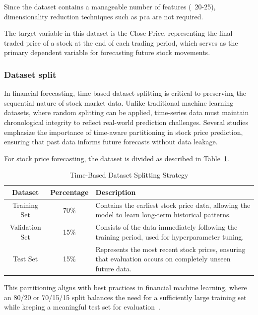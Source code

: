 Since the dataset contains a manageable number of features (~20-25),
dimensionality reduction techniques such as \acrfull{pca}
are not required. 

The target variable in this dataset is the Close Price, representing the final
traded price of a stock at the end of each trading period, which serves as the
primary dependent variable for forecasting future stock movements.

\subsubsection{Dataset split}

In financial forecasting, time-based dataset splitting is critical to
preserving the sequential nature of stock market data. Unlike traditional
machine learning datasets, where random splitting can be applied, time-series
data must maintain chronological integrity to reflect real-world prediction
challenges. Several studies emphasize the importance of time-aware partitioning
in stock price prediction, ensuring that past data informs future forecasts
without data leakage.

For stock price forecasting, the dataset is divided as described 
in Table~\ref{tab:dataset_split}.

\begin{table}[H]
    \centering
    \caption{Time-Based Dataset Splitting Strategy}
    \label{tab:dataset_split}
    \begin{tabular}{ccp{9cm}}
        \hline
        \textbf{Dataset} & \textbf{Percentage} & \textbf{Description} \\
        \hline\hline
        Training Set & 70\% & Contains the earliest stock
        price data, allowing the model to learn long-term historical patterns. \\
        Validation Set & 15\% & Consists of the data immediately following 
        the training period, used for hyperparameter tuning. \\
        Test Set & 15\% & Represents the most recent stock prices, ensuring that 
        evaluation occurs on completely unseen future data. \\
        \hline
    \end{tabular}
\end{table}

This partitioning aligns with best practices in financial machine learning, 
where an 80/20 or 70/15/15 split balances the need for a sufficiently large 
training set while keeping a meaningful test set for 
evaluation~\parencite{chang2024StockPrediction}.

